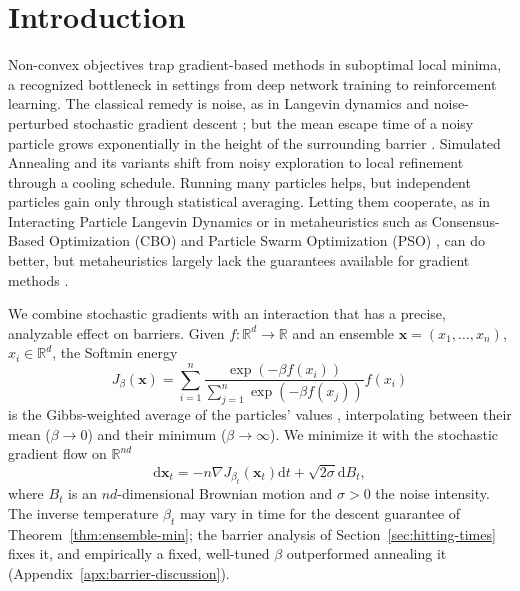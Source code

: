 \documentclass{article} %
\newcommand{\dd}{\mathrm d}
\theoremstyle{plain}
\theoremstyle{definition}
\theoremstyle{remark}
\newcommand{\xx}{\mathbf{x}}
\newcommand{\R}{\mathbb{R}}
\begin{document}
\section{Introduction}
Non-convex objectives trap gradient-based methods in suboptimal local minima, a recognized bottleneck in settings from deep network training to reinforcement learning. The classical remedy is noise, as in Langevin dynamics \citep{CoffeyKalmykovWaldron2004} and noise-perturbed stochastic gradient descent \citep{fehrman2020convergence}; but the mean escape time of a noisy particle grows exponentially in the height of the surrounding barrier \citep{berglund2011kramers}. Simulated Annealing and its variants \citep{kirkpatrick1983optimization,gelfand1990sampling,tang2024discrete} shift from noisy exploration to local refinement through a cooling schedule. Running many particles helps, but independent particles gain only through statistical averaging. Letting them cooperate, as in Interacting Particle Langevin Dynamics \citep{akyildiz2025interacting,encinar2025proximal} or in metaheuristics such as Consensus-Based Optimization (CBO) and Particle Swarm Optimization (PSO) \citep{bandaru2016metaheuristic,yang2020nature}, can do better, but metaheuristics largely lack the guarantees available for gradient methods \citep{hussain2019metaheuristic,rajwar2023exhaustive}.

We combine stochastic gradients with an interaction that has a precise, analyzable effect on barriers. Given $f:\R^d\to\R$ and an ensemble $\xx=(x_1,\dots,x_n)$, $x_i\in\R^d$, the Softmin energy
\begin{equation}
    J_\beta(\xx)=\sum_{i=1}^n\frac{\exp(-\beta f(x_i))}{\sum_{j=1}^n\exp(-\beta f(x_j))}f(x_i)
    \label{eq:Softmin-energy}
\end{equation}
is the Gibbs-weighted average of the particles' values \citep{bertsekas1999nonlinear}, interpolating between their mean ($\beta\to0$) and their minimum ($\beta\to\infty$). We minimize it with the stochastic gradient flow on $\R^{nd}$
\begin{equation}\label{e:sde}
   \dd\xx_t = -n\nabla J_{\beta_t}(\xx_t)\dd t+\sqrt{2\sigma}\dd B_t,
\end{equation}
where $B_t$ is an $nd$-dimensional Brownian motion and $\sigma>0$ the noise intensity. The inverse temperature $\beta_t$ may vary in time for the descent guarantee of Theorem~\ref{thm:ensemble-min}; the barrier analysis of Section~\ref{sec:hitting-times} fixes it, and empirically a fixed, well-tuned $\beta$ outperformed annealing it (Appendix~\ref{apx:barrier-discussion}).
\end{document}
